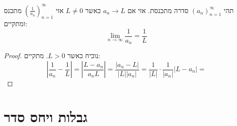 \documentclass{tstextbook}
\begin{document}
\begin{theorem}
תהי \((a_n)_{n=1}^\infty\) סדרה מתכנסת. אזי אם \(a_{n}\to L\) כאשר \(L\neq 0\) אזי \(\left( \frac{1}{a_{n}} \right)_{n=1}^\infty\) מתכנס ומתקיים:
$$\lim_{ n \to \infty } \frac{1}{a_{n}}=\frac{1}{L}$$

\end{theorem}
\begin{proof}
נוכיח כאשר \(L>0\). מתקיים:
$$\left\lvert  \frac{1}{a_{n}}-\frac{1}{L}  \right\rvert =\left\lvert  \frac{L - a_{n}}{a_{n}L}  \right\rvert =\frac{|a_{n}-L|}{|L||a_{n}|}=\frac{1}{|L|}\cdot \frac{1}{|a_{n}|}|L-a_{n}|=$$

\end{proof}
\section{גבלות ויחס סדר}
\end{document}
